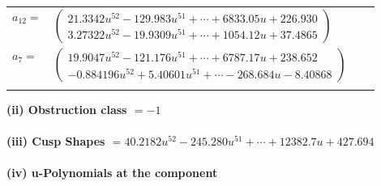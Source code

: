 \documentclass[1p]{elsarticle_modified}
\theoremstyle{definition}
\begin{document}
\begin{tabular}{m{7pt} m{180pt} m{7pt} m{180pt} }
\flushright $a_{12}=$&$\begin{pmatrix}21.3342 u^{52}-129.983 u^{51}+\cdots+6833.05 u+226.930\\3.27322 u^{52}-19.9309 u^{51}+\cdots+1054.12 u+37.4865\end{pmatrix}$ \\
\flushright $a_{7}=$&$\begin{pmatrix}19.9047 u^{52}-121.176 u^{51}+\cdots+6787.17 u+238.652\\-0.884196 u^{52}+5.40601 u^{51}+\cdots-268.684 u-8.40868\end{pmatrix}$\\&\end{tabular}
\flushleft \textbf{(ii) Obstruction class $= -1$}\\~\\
\flushleft \textbf{(iii) Cusp Shapes $= 40.2182 u^{52}-245.280 u^{51}+\cdots+12382.7 u+427.694$}\\~\\
\newpage\renewcommand{\arraystretch}{1}
\flushleft \textbf{(iv) u-Polynomials at the component}\newline \\
\end{document}
